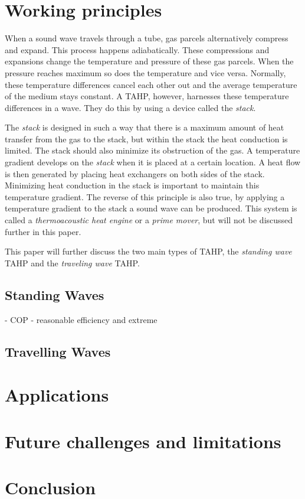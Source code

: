 \documentclass{article}
\newcommand{\newpara}
    {
      \bigbreak{}
      \noindent
    }
\begin{document}
\section{Working principles}
When a sound wave travels through a tube, gas parcels alternatively compress and expand. This process happens adiabatically. These compressions and expansions change the temperature and pressure of these gas parcels. When the pressure reaches maximum so does the temperature and vice versa. Normally, these temperature differences cancel each other out and the average temperature of the medium stays constant. %
A TAHP, however, harnesses these temperature differences in a wave. They do this by using a device called the \emph{stack}. %
\newpara{}
The \emph{stack} is designed in such a way that there is a maximum amount of heat transfer from the gas to the stack, but within the stack the heat conduction is limited. The stack should also minimize its obstruction of the gas. A temperature gradient develops on the \emph{stack} when it is placed at a certain location. A heat flow is then generated by placing heat exchangers on both sides of the stack. Minimizing heat conduction in the stack is important to maintain this temperature gradient. The reverse of this principle is also true, by applying a temperature gradient to the stack a sound wave can be produced. This system is called a \emph{thermoacoustic heat engine} or a \emph{prime mover}, but will not be discussed further in this paper.%
\newpara{}
This paper will further discuss the two main types of TAHP, the \emph{standing wave} TAHP and the \emph{traveling wave} TAHP.\@
\subsection{Standing Waves}
- COP
- reasonable efficiency and extreme
\subsection{Travelling Waves}

\section{Applications}

\section{Future challenges and limitations}

\section{Conclusion}
\end{document}
